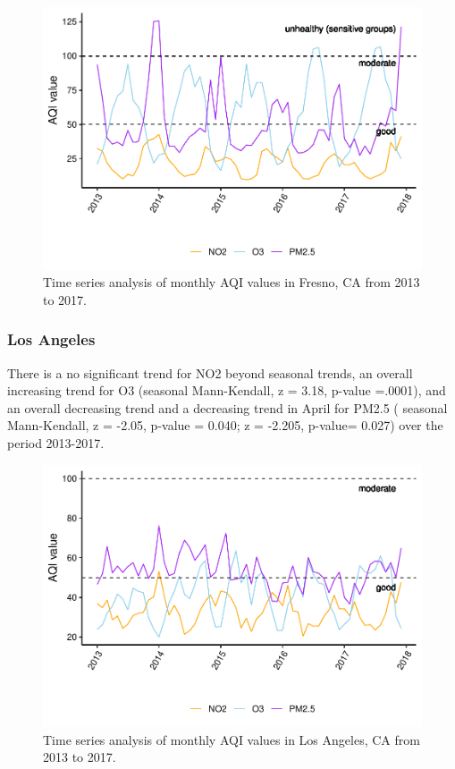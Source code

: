 \documentclass[12pt,]{article}
\begin{document}
\begin{figure}
\centering
\includegraphics{FinalProject_AliciaZhao_files/figure-latex/unnamed-chunk-18-1.pdf}
\caption{Time series analysis of monthly AQI values in Fresno, CA from
2013 to 2017.}
\end{figure}

\newpage

\hypertarget{los-angeles}{%
\subsubsection{Los Angeles}\label{los-angeles}}

There is a no significant trend for NO2 beyond seasonal trends, an
overall increasing trend for O3 (seasonal Mann-Kendall, z = 3.18,
p-value =.0001), and an overall decreasing trend and a decreasing trend
in April for PM2.5 ( seasonal Mann-Kendall, z = -2.05, p-value = 0.040;
z = -2.205, p-value= 0.027) over the period 2013-2017.

\begin{figure}
\centering
\includegraphics{FinalProject_AliciaZhao_files/figure-latex/unnamed-chunk-19-1.pdf}
\caption{Time series analysis of monthly AQI values in Los Angeles, CA
from 2013 to 2017.}
\end{figure}
\end{document}
